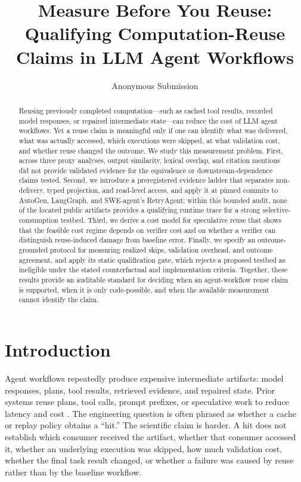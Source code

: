\documentclass[letterpaper]{article} %
\title{Measure Before You Reuse: Qualifying Computation-Reuse Claims in LLM Agent Workflows}
\author{Anonymous Submission}
\begin{document}
\maketitle

\begin{abstract}
Reusing previously completed computation---such as cached tool results, recorded
model responses, or repaired intermediate state---can reduce the cost of LLM
agent workflows. Yet a reuse claim is meaningful only if one can identify
what was delivered, what was actually accessed, which executions were
skipped, at what validation cost, and whether reuse changed the outcome. We
study this measurement problem. First, across three proxy analyses, output
similarity, lexical overlap, and citation mentions did not provide validated
evidence for the equivalence or downstream-dependence claims tested. Second,
we introduce a preregistered evidence ladder that separates non-delivery,
typed projection, and read-level access, and apply it at pinned commits to
AutoGen, LangGraph, and SWE-agent's RetryAgent; within this bounded audit,
none of the located public artifacts provides a qualifying runtime trace for
a strong selective-consumption testbed. Third, we derive a cost model for
speculative reuse that shows that the feasible cost regime depends on
verifier cost and on whether a verifier can distinguish reuse-induced damage
from baseline error. Finally, we specify an outcome-grounded protocol for
measuring realized skips, validation overhead, and outcome agreement, and
apply its static qualification gate, which rejects a proposed testbed as
ineligible under the stated counterfactual and implementation criteria.
Together, these results provide an auditable standard for deciding when an
agent-workflow reuse claim is supported, when it is only code-possible, and
when the available measurement cannot identify the claim.
\end{abstract}

\section{Introduction}

Agent workflows repeatedly produce expensive intermediate artifacts: model
responses, plans, tool results, retrieved evidence, and repaired state. Prior
systems reuse plans, tool calls, prompt prefixes, or speculative work to reduce
latency and cost \cite{agentreuse2024,toolcacheagent2026,kvflow2025,
promptcache2024,sherlock2025,speculativeActions2026}. The engineering question
is often phrased as whether a cache or replay policy obtains a ``hit.'' The
scientific claim is harder. A hit does not establish which consumer received
the artifact, whether that consumer accessed it, whether an underlying
execution was skipped, how much validation cost, whether the final task result
changed, or whether a failure was caused by reuse rather than by the baseline
workflow.
\end{document}
